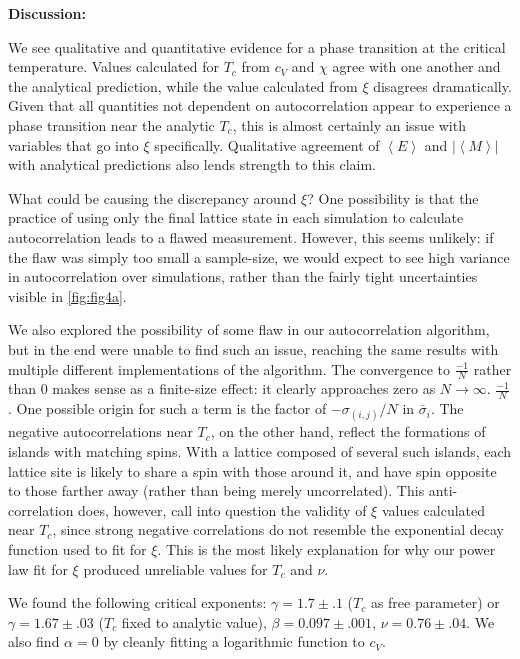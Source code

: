 \documentclass[letter,scriptaddress,twocolumn, prl,nofootinbib]{revtex4}
\newcommand{\submin}[1]{\left\langle #1 \right\rangle}
\begin{document}
\textbf{Discussion:}

We see qualitative and quantitative evidence for a phase transition at the critical temperature. Values calculated for $T_c$ from $c_V$ and $\chi$ agree with one another and the analytical prediction, while the value calculated from $\xi$ disagrees dramatically. Given that all quantities not dependent on autocorrelation appear to experience a phase transition near the analytic $T_c$, this is almost certainly an issue with variables that go into $\xi$ specifically. Qualitative agreement of $\submin{E}$ and $|\submin{M}|$ with analytical predictions also lends strength to this claim.

What could be causing the discrepancy around $\xi$? One possibility is that the practice of using only the final lattice state in each simulation to calculate autocorrelation leads to a flawed measurement. However, this seems unlikely: if the flaw was simply too small a sample-size, we would expect to see high variance in autocorrelation over simulations, rather than the fairly tight uncertainties visible in \autoref{fig:fig4a}.

We also explored the possibility of some flaw in our autocorrelation algorithm, but in the end were unable to find such an issue, reaching the same results with multiple different implementations of the algorithm. The convergence to $\frac{-1}{N}$ rather than $0$ makes sense as a finite-size effect: it clearly approaches zero as $N \rightarrow \infty$. $\frac{-1}{N}$. One possible origin for such a term is the factor of $-\sigma_{(i, j)}/N$ in $\bar{\sigma}_i$. The negative autocorrelations near $T_c$, on the other hand, reflect the formations of islands with matching spins. With a lattice composed of several such islands, each lattice site is likely to share a spin with those around it, and have spin opposite to those farther away (rather than being merely uncorrelated). This anti-correlation does, however, call into question the validity of $\xi$ values calculated near $T_c$, since strong negative correlations do not resemble the exponential decay function used to fit for $\xi$. This is the most likely explanation for why our power law fit for $\xi$ produced unreliable values for $T_c$ and $\nu$.

We found the following critical exponents: $\gamma = 1.7 \pm .1$ ($T_c$ as free parameter) or $\gamma = 1.67 \pm .03$ ($T_c$ fixed to analytic value), $\beta = 0.097 \pm .001$, $\nu = 0.76 \pm .04$. We also find $\alpha = 0$ by cleanly fitting a logarithmic function to $c_V$. 
\end{document}

